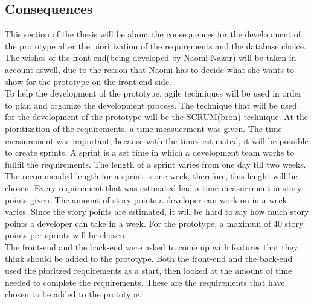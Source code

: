\documentclass[paper=a4, fontsize=11pt,twoside]{scrartcl}	%
\begin{document}
\subsection{Consequences}
This section of the thesis will be about the consequences for the development of the prototype after the pioritization of the requirements and the database choice. The wishes of the front-end(being developed by Naomi Nazar) will be taken in account aswell, due to the reason that Naomi has to decide what she wants to show for the prototype on the front-end side. \\
To help the development of the prototype, agile techniques will be used in order to plan and organize the development process. The technique that will be used for the development of the prototype will be the SCRUM(bron) technique. At the pioritization of the requirements, a time measuerment was given. The time measurement was important, because with the times estimated, it will be possible to create sprints. A sprint is a set time in which a development team works to fullfil the requirements. The length of a sprint varies from one day till two weeks. The recommended length for a sprint is one week, therefore, this lenght will be chosen. Every requirement that was estimated had a time measuerment in story points given. The amount of story points a developer can work on in a week varies. Since the story points are estimated, it will be hard to say how much story points a developer can take in a week. For the prototype, a maximun of 40 story points per sprints will be chosen. \\
The front-end and the back-end were asked to come up with features that they think should be added to the prototype. Both the front-end and the back-end used the pioritzed requirements as a start, then looked at the amount of time needed to complete the requirements. These are the requirements that have chosen to be added to the prototype. \\
\end{document}
